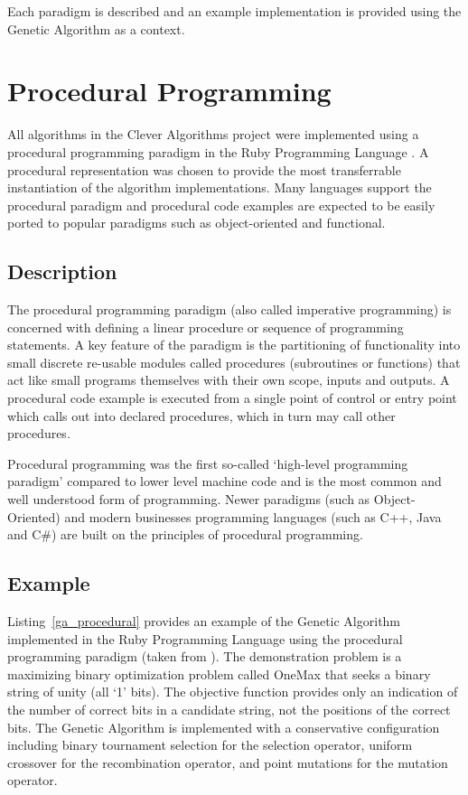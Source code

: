 \documentclass[a4paper, 11pt]{article}
\begin{document}
Each paradigm is described and an example implementation is provided using the Genetic Algorithm as a context.

% 
% 
\section{Procedural Programming}
\label{sec:procedural}
All algorithms in the Clever Algorithms project were implemented using a procedural programming paradigm in the Ruby Programming Language \cite{Brownlee2010au}. A procedural representation was chosen to provide the most transferrable instantiation of the algorithm implementations. Many languages support the procedural paradigm and procedural code examples are expected to be easily ported to popular paradigms such as object-oriented and functional.

\subsection{Description}
The procedural programming paradigm (also called imperative programming) is concerned with defining a linear procedure or sequence of programming statements. A key feature of the paradigm is the partitioning of functionality into small discrete re-usable modules called procedures (subroutines or functions) that act like small programs themselves with their own scope, inputs and outputs. A procedural code example is executed from a single point of control or entry point which calls out into declared procedures, which in turn may call other procedures.

Procedural programming was the first so-called `high-level programming paradigm' compared to lower level machine code and is the most common and well understood form of programming. Newer paradigms (such as Object-Oriented) and modern businesses programming languages (such as C++, Java and C\#) are built on the principles of procedural programming.

\subsection{Example}
Listing~\ref{ga_procedural} provides an example of the Genetic Algorithm implemented in the Ruby Programming Language using the procedural programming paradigm (taken from \cite{Brownlee2010p}).  
The demonstration problem is a maximizing binary optimization problem called OneMax that seeks a binary string of unity (all `1' bits). The objective function provides only an indication of the number of correct bits in a candidate string, not the positions of the correct bits.
The Genetic Algorithm is implemented with a conservative configuration including binary tournament selection for the selection operator, uniform crossover for the recombination operator, and point mutations for the mutation operator.
\end{document}
